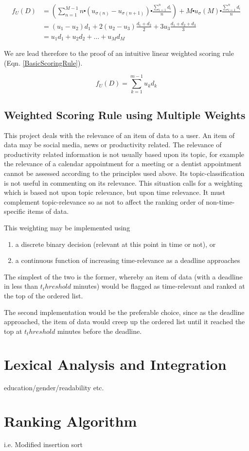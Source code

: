 \begin{align}\label{OurWeightedRuleDerivation}
f_U (D) &= \left(\sum_{n=1}^{M-1} n\centerdot (u_{\sigma{(n)}} - u_{\sigma{(n+1)}})\centerdot \frac{\sum_{i=1}^{n} d_i}{n}\right) + M \centerdot u_\sigma{(M)} \centerdot \frac{\sum_{i=1}^{n} d_i}{n} 
\\ &= (u_1-u_2)d_1 + 2(u_2-u_3)\frac{d_1+d_2}{2} + 3u_3\frac{d_1+d_2+d_3}{3}
\\ &= u_1d_1 + u_2d_2 + \dots + u_Md_M
\end{align}

We are lead therefore to the proof of an intuitive linear weighted scoring rule (Eqn. \ref{BasicScoringRule}).

\begin{equation}\label{BasicScoringRule}
f_U (D) = \sum_{k=1}^{m-1} u_kd_k
\end{equation}

\subsection{Weighted Scoring Rule using Multiple Weights}

This project deals with the relevance of an item of data to a user. An item of data may be social media, news or productivity related. The relevance of productivity related information is not usually based upon its topic, for example the relevance of a calendar appointment for a meeting or a dentist appointment cannot be assessed according to the principles used above. Its topic-classification is not useful in commenting on its relevance. This situation calls for a weighting which is based not upon topic relevance, but upon time relevance. It must complement topic-relevance so as not to affect the ranking order of non-time-specific items of data. 

This weighting may be implemented using 
\begin{enumerate}
  \item a discrete binary decision (relevant at this point in time or not), or 
  \item a continuous function of increasing time-relevance as a deadline approaches
\end{enumerate}

The simplest of the two is the former, whereby an item of data (with a deadline in less than $t_threshold$ minutes) would be flagged as time-relevant and ranked at the top of the ordered list. 

The second implementation would be the preferable choice, since as the deadline approached, the item of data would creep up the ordered list until it reached the top at $t_threshold$ minutes before the deadline. 


\section{Lexical Analysis and Integration}

education/gender/readability etc.

\section{Ranking Algorithm}

i.e. Modified insertion sort